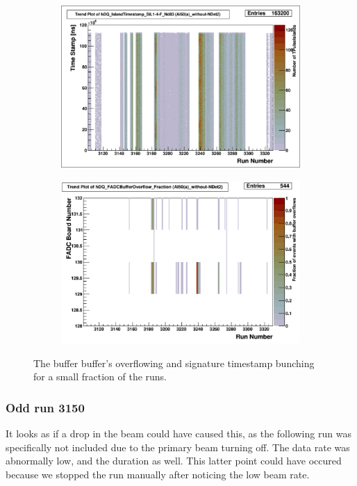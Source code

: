 \documentclass[a4paper]{article}
\begin{document}
\begin{figure}
  \centering
  \begin{subfigure}{0.5\textwidth}
    \includegraphics[width=0.9\linewidth]{figs/al50a/sil14f_timestamps}
  \end{subfigure}%
  \begin{subfigure}{0.5\textwidth}
    \includegraphics[width=0.9\linewidth]{figs/al50a/buffer_overflow}
  \end{subfigure}
  \caption{The buffer buffer's overflowing and signature timestamp bunching for a small fraction of the runs.}
  \label{fig:al50a_overflow}
\end{figure}


\subsubsection{Odd run 3150}
It looks as if a drop in the beam could have caused this, as the following run was specifically not included due
to the primary beam turning off. The data rate was abnormally low, and the duration as well. This latter point
could have occured because we stopped the run manually after noticing the low beam rate.
\end{document}

